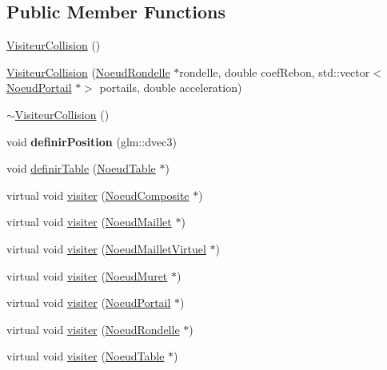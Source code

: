 \subsection*{Public Member Functions}
\begin{DoxyCompactItemize}
\item 
\hyperlink{class_visiteur_collision_adb7d5f275d9cf6cd9e9d74986058e700}{Visiteur\+Collision} ()
\item 
\hyperlink{class_visiteur_collision_a9383225a11bc84f3d5f3230b38df0d1f}{Visiteur\+Collision} (\hyperlink{class_noeud_rondelle}{Noeud\+Rondelle} $\ast$rondelle, double coef\+Rebon, std\+::vector$<$ \hyperlink{class_noeud_portail}{Noeud\+Portail} $\ast$$>$ portails, double acceleration)
\item 
\hyperlink{class_visiteur_collision_a92543e88d42df4f030c7e98737628d9a}{$\sim$\+Visiteur\+Collision} ()
\item 
\hypertarget{class_visiteur_collision_a289fb672e1cb408402cd4d5b0bc9fa7f}{}\label{class_visiteur_collision_a289fb672e1cb408402cd4d5b0bc9fa7f} 
void {\bfseries definir\+Position} (glm\+::dvec3)
\item 
void \hyperlink{class_visiteur_collision_a6bfba4fbee3a89120e5f78bdcccf535d}{definir\+Table} (\hyperlink{class_noeud_table}{Noeud\+Table} $\ast$)
\item 
virtual void \hyperlink{class_visiteur_collision_a60a7af24c85b42f39bdb9cf22b213f03}{visiter} (\hyperlink{class_noeud_composite}{Noeud\+Composite} $\ast$)
\item 
virtual void \hyperlink{class_visiteur_collision_ab5a50a3f4a1b1658eb0106a1f455fbaa}{visiter} (\hyperlink{class_noeud_maillet}{Noeud\+Maillet} $\ast$)
\item 
virtual void \hyperlink{class_visiteur_collision_a598b2bec9120bdc329721c94bb89b2b1}{visiter} (\hyperlink{class_noeud_maillet_virtuel}{Noeud\+Maillet\+Virtuel} $\ast$)
\item 
virtual void \hyperlink{class_visiteur_collision_a9a87666874976c2354ae6008c5d295ed}{visiter} (\hyperlink{class_noeud_muret}{Noeud\+Muret} $\ast$)
\item 
virtual void \hyperlink{class_visiteur_collision_a0dddecba0e89904757fca3d9081d678f}{visiter} (\hyperlink{class_noeud_portail}{Noeud\+Portail} $\ast$)
\item 
virtual void \hyperlink{class_visiteur_collision_ad679b2bdfe4bc0105ff638ddb5f447cc}{visiter} (\hyperlink{class_noeud_rondelle}{Noeud\+Rondelle} $\ast$)
\item 
virtual void \hyperlink{class_visiteur_collision_ab071b0f0b2d05d622c4698a652f19e77}{visiter} (\hyperlink{class_noeud_table}{Noeud\+Table} $\ast$)
$$
\end{DoxyCompactItemize}
